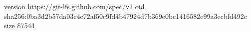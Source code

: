version https://git-lfs.github.com/spec/v1
oid sha256:0ba3d2b57da03c4c72af50c9fd4b47924d7b369e0bc1416582e99a3ecbfd492c
size 87544
